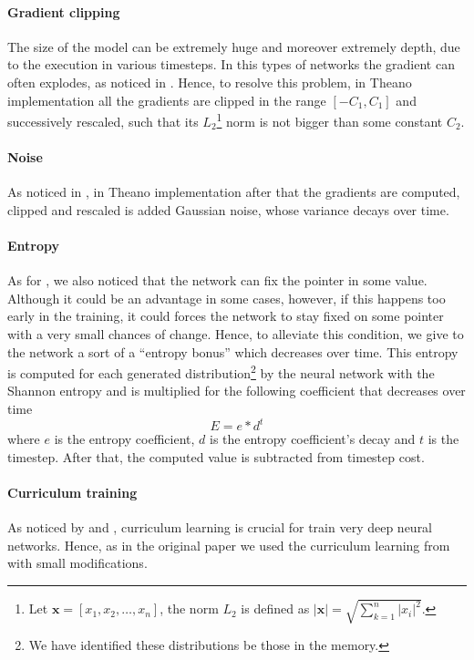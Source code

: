 \paragraph{Gradient clipping}
The size of the model can be extremely huge and moreover extremely depth, due to the execution in various timesteps. In this types of networks the gradient can often explodes, as noticed in \cite{Bengio1994LearningLD}. Hence, to resolve this problem, in Theano implementation all the gradients are clipped in the range $[-C_1, C_1]$ and successively rescaled, such that its $L_2$\footnote{Let $\textbf{x} = [x_1, x_2, \dots, x_n]$, the norm $L_2$ is defined as $|\textbf{x}| = \sqrt{\sum\limits_{k=1}^{n}|x_i|^2}$.} norm is not bigger than some constant $C_2$.

\paragraph{Noise}
As noticed in \cite{Neelakantan2015AddingGN}, in Theano implementation after that the gradients are computed, clipped and rescaled is added Gaussian noise, whose variance decays over time.

\paragraph{Entropy}
As for \cite{NRAM:2016}, we also noticed that the network can fix the pointer in some value. Although it could be an advantage in some cases, however, if this happens too early in the training, it could forces the network to stay fixed on some pointer with a very small chances of change. Hence, to alleviate this condition, we give to the network a sort of a ``entropy bonus'' which decreases over time. This entropy is computed for each generated distribution\footnote{We have identified these distributions be those in the memory.} by the neural network with the Shannon entropy and is multiplied for the following coefficient that decreases over time
\begin{equation}
	E = e * d^{t}
\end{equation}
where $e$ is the entropy coefficient, $d$ is the entropy coefficient's decay and $t$ is the timestep. After that, the computed value is subtracted from timestep cost.

\paragraph{Curriculum training}
As noticed by \cite{Bengio2009CurriculumL} and \cite{Zaremba2014LearningTE}, curriculum learning is crucial for train very deep neural networks. Hence, as in the original paper we used the curriculum learning from \cite{Zaremba2014LearningTE} with small modifications.

